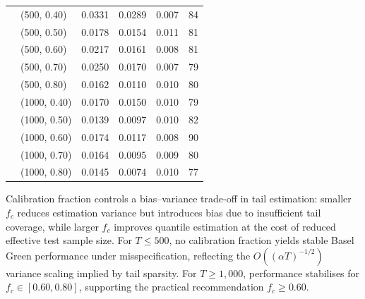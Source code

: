 \begin{table}[H]
\begin{tabular}{@{}llcccc@{}}
		\addlinespace
		& (500, 0.40) & 0.0331 & 0.0289 & 0.007 & 84 \\
		& (500, 0.50) & 0.0178 & 0.0154 & 0.011 & 81 \\
		& (500, 0.60) & 0.0217 & 0.0161 & 0.008 & 81 \\
		& (500, 0.70) & 0.0250 & 0.0170 & 0.007 & 79 \\
		& (500, 0.80) & 0.0162 & 0.0110 & 0.010 & 80 \\
		\addlinespace
		& (1000, 0.40) & 0.0170 & 0.0150 & 0.010 & 79 \\
		& (1000, 0.50) & 0.0139 & 0.0097 & 0.010 & 82 \\
		& (1000, 0.60) & 0.0174 & 0.0117 & 0.008 & 90 \\
		& (1000, 0.70) & 0.0164 & 0.0095 & 0.009 & 80 \\
		& (1000, 0.80) & 0.0145 & 0.0074 & 0.010 & 77 \\
		\bottomrule
	\end{tabular}

	\begin{minipage}{\linewidth}\footnotesize
		\smallskip
		Calibration fraction controls a bias--variance trade-off in tail estimation: smaller $f_c$ reduces estimation variance but introduces bias due to insufficient tail coverage, while larger $f_c$ improves quantile estimation at the cost of reduced effective test sample size. For $T \leq 500$, no calibration fraction yields stable Basel Green performance under misspecification, reflecting the $O((\alpha T)^{-1/2})$ variance scaling implied by tail sparsity. For $T \geq 1{,}000$, performance stabilises for $f_c \in [0.60, 0.80]$, supporting the practical recommendation $f_c \geq 0.60$.
	\end{minipage}
\end{table}